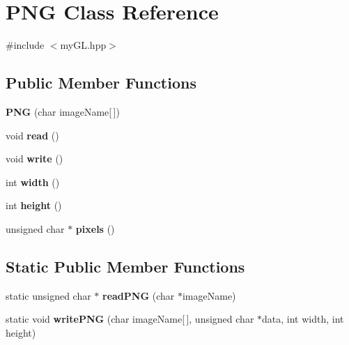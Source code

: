\hypertarget{classPNG}{}\section{P\+N\+G Class Reference}
\label{classPNG}


{\ttfamily \#include $<$my\+G\+L.\+hpp$>$}

\subsection*{Public Member Functions}
\begin{DoxyCompactItemize}
\item 
\hypertarget{classPNG_a8239ef58cce7dfa23bf02a7620e985f5}{}{\bfseries P\+N\+G} (char image\+Name\mbox{[}$\,$\mbox{]})\label{classPNG_a8239ef58cce7dfa23bf02a7620e985f5}

\item 
\hypertarget{classPNG_a48b56be2d085e01f01b140528f999f5b}{}void {\bfseries read} ()\label{classPNG_a48b56be2d085e01f01b140528f999f5b}

\item 
\hypertarget{classPNG_a3e0b622c7ab188c3024295f8eebedd04}{}void {\bfseries write} ()\label{classPNG_a3e0b622c7ab188c3024295f8eebedd04}

\item 
\hypertarget{classPNG_a2b1a554b4f86d1b8ffa07c298782b14d}{}int {\bfseries width} ()\label{classPNG_a2b1a554b4f86d1b8ffa07c298782b14d}

\item 
\hypertarget{classPNG_ad6f6685a921c0f26352e22dc144fdda6}{}int {\bfseries height} ()\label{classPNG_ad6f6685a921c0f26352e22dc144fdda6}

\item 
\hypertarget{classPNG_a07898bac65710ae8aaeea6048dc773bc}{}unsigned char $\ast$ {\bfseries pixels} ()\label{classPNG_a07898bac65710ae8aaeea6048dc773bc}

\end{DoxyCompactItemize}
\subsection*{Static Public Member Functions}
\begin{DoxyCompactItemize}
\item 
\hypertarget{classPNG_a6df04a0372aa1054cc85a219829d882a}{}static unsigned char $\ast$ {\bfseries read\+P\+N\+G} (char $\ast$image\+Name)\label{classPNG_a6df04a0372aa1054cc85a219829d882a}

\item 
\hypertarget{classPNG_a12fe7f480b617e0cd58bd0ca7a65ed3a}{}static void {\bfseries write\+P\+N\+G} (char image\+Name\mbox{[}$\,$\mbox{]}, unsigned char $\ast$data, int width, int height)\label{classPNG_a12fe7f480b617e0cd58bd0ca7a65ed3a}

\end{DoxyCompactItemize}
